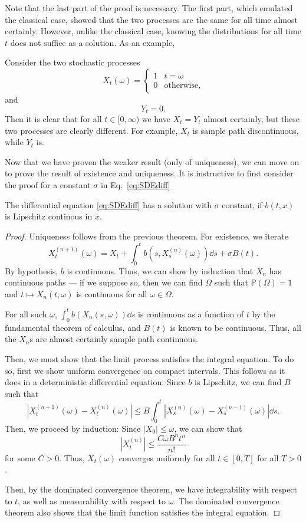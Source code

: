 \documentclass[prb,12pt]{revtex4-2}
\theoremstyle{definition}
\theoremstyle{definition}
\theoremstyle{definition}
\begin{document}
Note that the last part of the proof is necessary. The first part, which emulated the classical case, showed that the two processes are the same for all time almost certainly. However, unlike the classical case, knowing the distributions for all time $t$ does not suffice as a solution. As an example,
\begin{Example}
	Consider the two stochastic processes
	\[
	X_t(\omega) = \begin{cases}
		1 & t = \omega\\
		0  & \text{otherwise,}
	\end{cases}
	\]
	and
	\[
	Y_t=0
	.\] 
	Then it is clear that for all $t\in [0,\infty)$ we have $X_t=Y_t$ almost certainly, but these two processes are clearly different. For example, $X_t$ is sample path discontinuous, while $Y_t$ is.
\end{Example}
Now that we have proven the weaker result (only of uniqueness), we can move on to prove the result of existence and uniqueness. It is instructive to first consider the proof for a constant $\sigma$ in Eq.~\eqref{eq:SDEdiff}
\begin{Theorem}
	The differential equation \eqref{eq:SDEdiff} has a solution with $\sigma$ constant, if $b(t, x)$ is Lipschitz continous in $x$.
\end{Theorem}
\begin{proof}
	Uniqueness follows from the previous theorem. For existence, we iterate
	\[
	X^{(n+1)}_t(\omega)=X_t+\int_0^t b(s, X^{(n)}_s(\omega))\dd{s}+\sigma B(t)
	.\] 
	By hypothesis, $b$ is continuous. Thus, we can show by induction that $X_n$ has continuous paths --- if we suppose so, then we can find $\Omega$ such that $\mathbb{P}(\Omega)=1$ and $t\mapsto X_n(t, \omega)$ is continuous for all $\omega\in \Omega$. 

	For all such $\omega$, $\int_0^t b(X_n(s, \omega))\dd{s}$ is continuous as a function of $t$ by the fundamental theorem of calculus, and $B(t)$ is known to be continuous. Thus, all the $X_n$s are almost certainly sample path continuous.

	Then, we must show that the limit process satisfies the integral equation. To do so, first we show uniform convergence on compact intervals. This follows as it does in a deterministic differential equation: Since $b$ is Lipschitz, we can find $B$ such that
	\[
	|X^{(n+1)}_t(\omega)-X^{(n)}_t(\omega)| \le B \int_0^t |X^{(n)}_s(\omega) - X^{(n-1)}_s(\omega)|\dd{s} 
	.\] 
	Then, we proceed by induction: Since $|X_0|\le \omega$, we can show that
	\[
	|X^{(n)}_t| \le \frac{C \omega B^n t^n}{n!}
	\]
	for some $C>0$. Thus, $X_t(\omega)$ converges uniformly for all $t\in [0,T]$ for all $T>0$. 

	Then, by the dominated convergence theorem, we have integrability with respect to $t$, as well as measurability with respect to $\omega$. The dominated convergence theorem also shows that the limit function satisfies the integral equation.
\end{proof}
\end{document}
